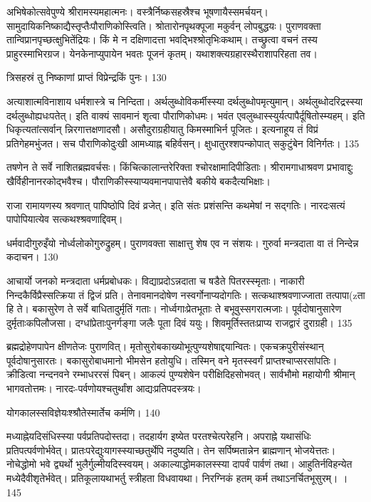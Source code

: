   अभिषेकोत्सवेपुण्ये श्रीरामस्यमहात्मनः।
 वस्त्रैर्निष्कसहस्रैश्च भूषणायैस्समर्चयन्।
 सामुदायिकनिष्काद्यैस्तृप्तैःपौराणिकोस्त्विति।
 श्रोतारोनपृथक्पूजा मकुर्वन् लोपबुद्धयः।
 पुराणवक्ता तान्विप्रानपृच्छत्क्षुभितेंद्रियः।
 किं मे न दक्षिणादत्ता भवद्भिश्श्रोतृभिःकथाम्।
 तच्छ्रुत्वा वचनं तस्य प्राहुरस्माभिरग्रज।
 येनकेनाप्युपायेन भवतः पूजनं कृतम्।
 यथाशक्त्यग्रहारस्थैराशापरिहता तव।
 
त्रिसहस्रं तु निष्काणां प्राप्तं विप्रेन्द्रकिं पुनः।
 130

  अत्याशात्मविनाशाय धर्मशास्त्रे च निन्दिता।
 अर्थलुब्धोविकर्मीस्स्या दर्थलुब्धोपमृत्युमान्।
 अर्थलुब्धोदरिद्रस्स्या दर्थलुब्धोह्यधःपतेत्।
 इति वाक्यं सावमानं शृत्वा पौराणिकोधमः।
 भवंत एवलुब्धास्स्युर्यत्पापैर्दूषितोस्म्यहम्।
 इति धिकृत्यतांत्सर्वान् न्निरगात्तक्षणादसौ।
 असौदुराग्रहीयातु किमस्माभिर्न पूजितः।
 इत्यनाहूय तं विप्रं प्रतिगेहमभुंजत।
 सच पौराणिकोदुःखी आमध्याह्न बहिर्वसन्।
 क्षुधातुरश्शपन्कोपात् सकुटुंबेन विनिर्गतः।
 135

  तषणेन ते सर्वे नाशितब्रह्मवर्चसः।
 किंचित्कालान्तरेरिक्ता श्चोरक्षामादिपीडिताः।
 श्रीरामगाधाश्रवण प्रभावाद्दुः
खैर्विहीनानरकोद्भवैश्च।
 पौराणिकीस्स्याप्यवमानपापात्तेवै
बकीये बकदैत्यभिक्षाः।

राजा
रामायणस्य श्रवणात् पापिष्ठोपि दिवं व्रजेत्।
 इति संतः प्रशंसन्ति कथमेषां न सद्गतिः।
 नारदःसत्यं पापोपियात्येव सत्कथश्श्रवणाद्दिवम्।
 
धर्मवादीगुरुइँयो नोर्ध्वलोकोगुरुद्रुहम्।
 पुराणवक्ता साक्षात्तु शेष एव न संशयः।
 गुरुर्वा मन्त्रदाता वा तं निन्देन्न कदाचन।
 130

  आचार्यो जनको मन्त्रदाता धर्मप्रबोधकः।
 विद्याप्रदोऽन्नदाता च षडैते पितरस्स्मृताः।
 नाकारी निन्दकैर्विप्रैस्सत्क्रिया तं द्विजं प्रति।
 तेनावमानदोषेण नस्वर्गोनाप्यदोगतिः।
 सत्कथाश्श्रवणाज्जाता तत्पापा(zता हि ते।
 बकासुरेण ते सर्वे बाधितादुर्मृतिं गताः।
 नोर्ध्वगाःप्रेतभूताः ते बभूवुस्सगरात्मजाः।
 पूर्वदोषानुसारेण दुर्मृताःकपिलौजसा।
 दग्धांप्रेताःपुनर्गङ्गा जलैः पूता दिवं ययुः।
 शिवमूर्तिस्ततःप्राप्य राजद्वारं दुराग्रही।
 135

  ब्रह्मद्रोहेणपापेन क्षीणतेजः पुराणवित्।
 मृतोसुरोबकाख्योभूत्पुण्यशेषाद्दयान्वितः।
 एकचक्रपुरीसंस्थान् पूर्वदोषानुसारतः।
 बकासुरोबाधमानो भीमसेन हतोयुधि।
 तस्मिन् वने मृतस्स्वर्गं प्राप्तश्चाप्सरसांपतिः।
 क्रीडित्वा नन्दनवने रम्भाधररसं पिबन्।
 आकल्पं पुण्यशेषेन परीक्षिदिहसोभवत्।
 सार्वभौमो महायोगी श्रीमान् भागवतोत्तमः।
 नारदः-पर्वणोयश्चतुर्थांश आद्यःप्रतिपदस्त्रयः।
 
योगकालस्सविज्ञेयःश्श्रौतेस्मार्तेच कर्मणि।
 140

  मध्याह्नेयदिसंधिस्स्या पर्वप्रतिपदोस्तदा।
 तदहार्यग इष्येत परतश्चेत्परेहनि।
 अपराह्ने यथासंधिः प्रतिपत्पर्वणोर्भवेत्।
 प्रातःपरेद्युःयागस्स्याच्छतुर्थेपि नदुष्यति।
 तेन सर्पिष्मतान्नेन ब्राह्मणान् भोजयेत्ततः।
 नोचेद्धोमो भवे द्व्यर्थो भुलैर्गुल्मीयदिस्स्वयम्।
 अकाल्याद्धोमकालस्स्या दापर्वं पार्वणं तथा।
 आहुतिर्नविहन्येत मध्येदैवीशृतेर्भवेत्।
 प्रतिकूलायथाभर्तु स्त्रीहता विधवायथा।
 निरग्निकं हतम् कर्म तथाऽनर्चितभूसुरम्।
 ।
 145

